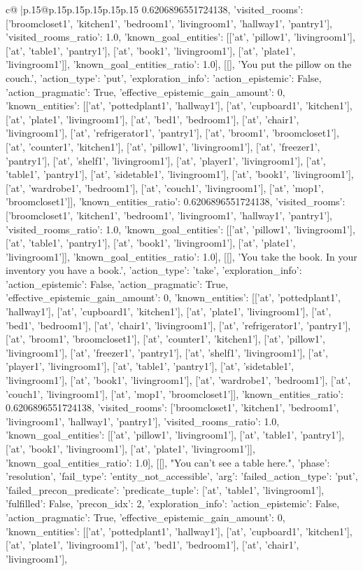 \documentclass{article}
\begin{document}
{\begin{supertabular}{c@{$\;$}|p{.15\linewidth}@{}p{.15\linewidth}p{.15\linewidth}p{.15\linewidth}p{.15\linewidth}p{.15\linewidth}}
{{{0.6206896551724138, 'visited_rooms': ['broomcloset1', 'kitchen1', 'bedroom1', 'livingroom1', 'hallway1', 'pantry1'], 'visited_rooms_ratio': 1.0, 'known_goal_entities': [['at', 'pillow1', 'livingroom1'], ['at', 'table1', 'pantry1'], ['at', 'book1', 'livingroom1'], ['at', 'plate1', 'livingroom1']], 'known_goal_entities_ratio': 1.0}}], [[], 'You put the pillow on the couch.', {'action_type': 'put', 'exploration_info': {'action_epistemic': False, 'action_pragmatic': True, 'effective_epistemic_gain_amount': 0, 'known_entities': [['at', 'pottedplant1', 'hallway1'], ['at', 'cupboard1', 'kitchen1'], ['at', 'plate1', 'livingroom1'], ['at', 'bed1', 'bedroom1'], ['at', 'chair1', 'livingroom1'], ['at', 'refrigerator1', 'pantry1'], ['at', 'broom1', 'broomcloset1'], ['at', 'counter1', 'kitchen1'], ['at', 'pillow1', 'livingroom1'], ['at', 'freezer1', 'pantry1'], ['at', 'shelf1', 'livingroom1'], ['at', 'player1', 'livingroom1'], ['at', 'table1', 'pantry1'], ['at', 'sidetable1', 'livingroom1'], ['at', 'book1', 'livingroom1'], ['at', 'wardrobe1', 'bedroom1'], ['at', 'couch1', 'livingroom1'], ['at', 'mop1', 'broomcloset1']], 'known_entities_ratio': 0.6206896551724138, 'visited_rooms': ['broomcloset1', 'kitchen1', 'bedroom1', 'livingroom1', 'hallway1', 'pantry1'], 'visited_rooms_ratio': 1.0, 'known_goal_entities': [['at', 'pillow1', 'livingroom1'], ['at', 'table1', 'pantry1'], ['at', 'book1', 'livingroom1'], ['at', 'plate1', 'livingroom1']], 'known_goal_entities_ratio': 1.0}}], [[], 'You take the book. In your inventory you have a book.', {'action_type': 'take', 'exploration_info': {'action_epistemic': False, 'action_pragmatic': True, 'effective_epistemic_gain_amount': 0, 'known_entities': [['at', 'pottedplant1', 'hallway1'], ['at', 'cupboard1', 'kitchen1'], ['at', 'plate1', 'livingroom1'], ['at', 'bed1', 'bedroom1'], ['at', 'chair1', 'livingroom1'], ['at', 'refrigerator1', 'pantry1'], ['at', 'broom1', 'broomcloset1'], ['at', 'counter1', 'kitchen1'], ['at', 'pillow1', 'livingroom1'], ['at', 'freezer1', 'pantry1'], ['at', 'shelf1', 'livingroom1'], ['at', 'player1', 'livingroom1'], ['at', 'table1', 'pantry1'], ['at', 'sidetable1', 'livingroom1'], ['at', 'book1', 'livingroom1'], ['at', 'wardrobe1', 'bedroom1'], ['at', 'couch1', 'livingroom1'], ['at', 'mop1', 'broomcloset1']], 'known_entities_ratio': 0.6206896551724138, 'visited_rooms': ['broomcloset1', 'kitchen1', 'bedroom1', 'livingroom1', 'hallway1', 'pantry1'], 'visited_rooms_ratio': 1.0, 'known_goal_entities': [['at', 'pillow1', 'livingroom1'], ['at', 'table1', 'pantry1'], ['at', 'book1', 'livingroom1'], ['at', 'plate1', 'livingroom1']], 'known_goal_entities_ratio': 1.0}}], [[], "You can't see a table here.", {'phase': 'resolution', 'fail_type': 'entity_not_accessible', 'arg': {'failed_action_type': 'put', 'failed_precon_predicate': {'predicate_tuple': ['at', 'table1', 'livingroom1'], 'fulfilled': False, 'precon_idx': 2}}, 'exploration_info': {'action_epistemic': False, 'action_pragmatic': True, 'effective_epistemic_gain_amount': 0, 'known_entities': [['at', 'pottedplant1', 'hallway1'], ['at', 'cupboard1', 'kitchen1'], ['at', 'plate1', 'livingroom1'], ['at', 'bed1', 'bedroom1'], ['at', 'chair1', 'livingroom1'], }}}
\end{supertabular}}
\end{document}
